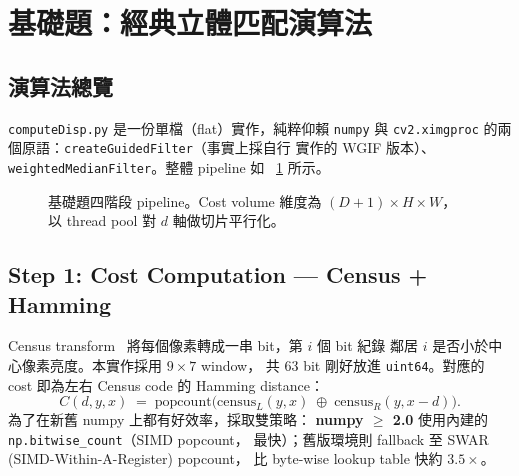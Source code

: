 \documentclass[11pt,a4paper]{article}
\begin{document}
\section{基礎題：經典立體匹配演算法}
\label{sec:basic}

\subsection{演算法總覽}
\label{sec:basic-overview}
\texttt{computeDisp.py} 是一份單檔（flat）實作，純粹仰賴 \texttt{numpy} 與
\texttt{cv2.ximgproc} 的兩個原語：\texttt{createGuidedFilter}（事實上採自行
實作的 WGIF 版本）、\texttt{weightedMedianFilter}。整體 pipeline 如
\figurename~\ref{fig:basic-pipeline} 所示。

\begin{figure}[H]
  \centering
  \caption{基礎題四階段 pipeline。Cost volume 維度為 $(D{+}1)\!\times\!H\!\times\!W$，
  以 thread pool 對 $d$ 軸做切片平行化。}
  \label{fig:basic-pipeline}
\end{figure}

\subsection{Step 1: Cost Computation — Census + Hamming}
Census transform~\cite{Zabih1994} 將每個像素轉成一串 bit，第 $i$ 個 bit 紀錄
鄰居 $i$ 是否小於中心像素亮度。本實作採用 $9\!\times\!7$ window，
共 $63$ bit 剛好放進 \texttt{uint64}。對應的 cost 即為左右 Census code 的
Hamming distance：
\begin{equation}
  C(d, y, x) \;=\; \mathrm{popcount}\!\big(\mathrm{census}_L(y,x)\;\oplus\;\mathrm{census}_R(y,x{-}d)\big).
  \label{eq:census-cost}
\end{equation}
為了在新舊 numpy 上都有好效率，採取雙策略：
\textbf{numpy $\ge$ 2.0} 使用內建的 \texttt{np.bitwise\_count}（SIMD popcount，
最快）；舊版環境則 fallback 至 SWAR (SIMD-Within-A-Register) popcount，
比 byte-wise lookup table 快約 $3.5\!\times$。
\end{document}
